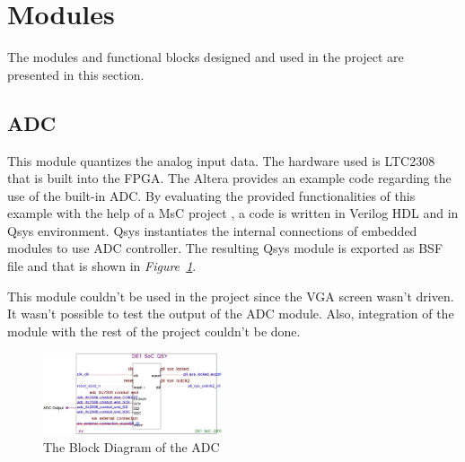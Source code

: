 \documentclass[paper]{IEEEtran}
\begin{document}
	\section{Modules}
	\- \indent
	The modules and functional blocks designed and used in the project are presented in this section.
	
	\subsection{ADC} \- \indent
	This module quantizes the analog input data. The hardware used is LTC2308 that is built into the FPGA. The Altera provides an example code regarding the use of the built-in ADC\cite{b1}. By evaluating the provided functionalities of this example with the help of a MsC project \cite{b2}, a code is written in Verilog HDL and in Qsys environment. Qsys instantiates the internal connections of embedded modules to use ADC controller. The resulting Qsys module is exported as BSF file and that is shown in \textit{Figure~\ref{fig:adc_block}}.
	
	This module couldn't be used in the project since the VGA screen wasn't driven. It wasn't possible to test the output of the ADC module. Also, integration of the module with the rest of the project couldn't be done.
	
	\begin{figure}[H]
		\setlength{\unitlength}{\textwidth}
		\center 
		\includegraphics[width=0.47\textwidth]{adc_block}
		\caption{\label{fig:adc_block}The Block Diagram of the ADC}
	\end{figure}
	
\end{document}
